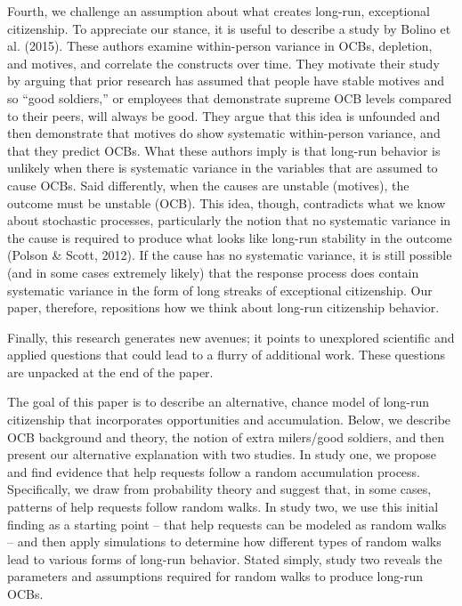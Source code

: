 \documentclass[english,,man]{apa6}
\theoremstyle{definition}
\theoremstyle{definition}
\theoremstyle{definition}
\theoremstyle{remark}
\begin{document}
Fourth, we challenge an assumption about what creates long-run,
exceptional citizenship. To appreciate our stance, it is useful to
describe a study by Bolino et al. (2015). These authors examine
within-person variance in OCBs, depletion, and motives, and correlate
the constructs over time. They motivate their study by arguing that
prior research has assumed that people have stable motives and so
\enquote{good soldiers,} or employees that demonstrate supreme OCB
levels compared to their peers, will always be good. They argue that
this idea is unfounded and then demonstrate that motives do show
systematic within-person variance, and that they predict OCBs. What
these authors imply is that long-run behavior is unlikely when there is
systematic variance in the variables that are assumed to cause OCBs.
Said differently, when the causes are unstable (motives), the outcome
must be unstable (OCB). This idea, though, contradicts what we know
about stochastic processes, particularly the notion that no systematic
variance in the cause is required to produce what looks like long-run
stability in the outcome (Polson \& Scott, 2012). If the cause has no
systematic variance, it is still possible (and in some cases extremely
likely) that the response process does contain systematic variance in
the form of long streaks of exceptional citizenship. Our paper,
therefore, repositions how we think about long-run citizenship behavior.

Finally, this research generates new avenues; it points to unexplored
scientific and applied questions that could lead to a flurry of
additional work. These questions are unpacked at the end of the paper.

The goal of this paper is to describe an alternative, chance model of
long-run citizenship that incorporates opportunities and accumulation.
Below, we describe OCB background and theory, the notion of extra
milers/good soldiers, and then present our alternative explanation with
two studies. In study one, we propose and find evidence that help
requests follow a random accumulation process. Specifically, we draw
from probability theory and suggest that, in some cases, patterns of
help requests follow random walks. In study two, we use this initial
finding as a starting point -- that help requests can be modeled as
random walks -- and then apply simulations to determine how different
types of random walks lead to various forms of long-run behavior. Stated
simply, study two reveals the parameters and assumptions required for
random walks to produce long-run OCBs.
\end{document}
